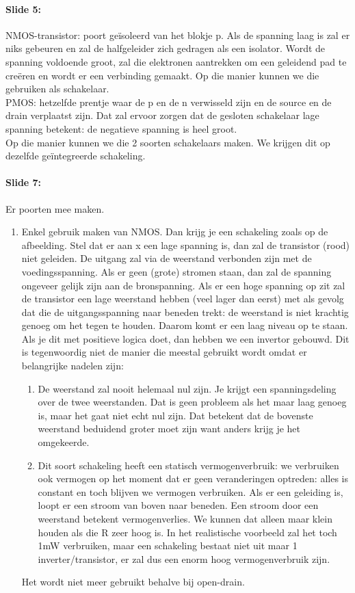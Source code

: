 \documentclass[10pt,a4paper]{book}
\begin{document}
\paragraph{Slide 5:} NMOS-transistor: poort ge\"isoleerd van het blokje p. Als de spanning laag is zal er niks gebeuren en zal de halfgeleider zich gedragen als een isolator. Wordt de spanning voldoende groot, zal die elektronen aantrekken om een geleidend pad te cre\"eren en wordt er een verbinding gemaakt. Op die manier kunnen we die gebruiken als schakelaar.\\
PMOS: hetzelfde prentje waar de p en de n verwisseld zijn en de source en de drain verplaatst zijn. Dat zal ervoor zorgen dat de gesloten schakelaar lage spanning betekent: de negatieve spanning is heel groot. \\
Op die manier kunnen we die 2 soorten schakelaars maken. We krijgen dit op dezelfde ge\"integreerde schakeling.

\paragraph{Slide 7:} Er poorten mee maken. 
\begin{enumerate}
\item Enkel gebruik maken van NMOS. Dan krijg je een schakeling zoals op de afbeelding. Stel dat er aan x een lage spanning is, dan zal de transistor (rood) niet geleiden. De uitgang zal via de weerstand verbonden zijn met de voedingsspanning. Als er geen (grote) stromen staan, dan zal de spanning ongeveer gelijk zijn aan de bronspanning. Als er een hoge spanning op zit zal de transistor een lage weerstand hebben (veel lager dan eerst) met als gevolg dat die de uitgangsspanning naar beneden trekt: de weerstand is niet krachtig genoeg om het tegen te houden.  Daarom komt er een laag niveau op te staan. Als je dit met positieve logica doet, dan hebben we een invertor gebouwd. Dit is tegenwoordig niet de manier die meestal gebruikt wordt omdat er belangrijke nadelen zijn: 
\begin{enumerate}
\item De weerstand zal nooit helemaal nul zijn. Je krijgt een spanningsdeling over de twee weerstanden. Dat is geen probleem als het maar laag genoeg is, maar het gaat niet echt nul zijn. Dat betekent dat de bovenste weerstand beduidend groter moet zijn want anders krijg je het omgekeerde.
\item Dit soort schakeling heeft een statisch vermogenverbruik: we verbruiken ook vermogen op het moment dat er geen veranderingen optreden: alles is constant en toch blijven we vermogen verbruiken. Als er een geleiding is, loopt er een stroom van boven naar beneden. Een stroom door een weerstand betekent vermogenverlies. We kunnen dat alleen maar klein houden als die R zeer hoog is. In het realistische voorbeeld zal het toch 1mW verbruiken, maar een schakeling bestaat niet uit maar 1 inverter/transistor, er zal dus een enorm hoog vermogenverbruik zijn. 
\end{enumerate}
Het wordt niet meer gebruikt behalve bij open-drain.
\end{enumerate}
\end{document}
